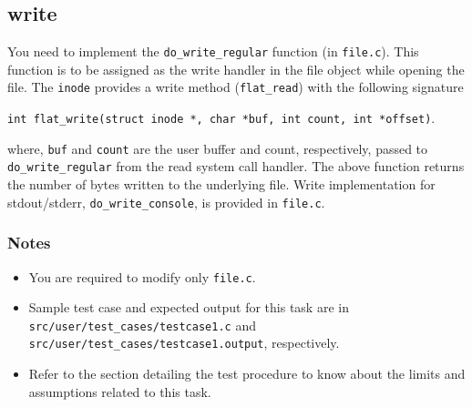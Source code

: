 \documentclass[12pt]{article}
\begin{document}
\subsection{write}

You need to implement the {\tt do\_write\_regular} function (in {\tt file.c}). This function is to be assigned as the write handler 
in the file object while opening the file. The {\tt inode} provides a write method ({\tt flat\_read}) with the following signature


\vspace{0.25cm}
\noindent
{\tt int flat\_write(struct inode *, char *buf, int count, int *offset)}. 
\vspace{0.25cm}

\noindent
where, {\tt buf} and {\tt count} are the user buffer and count, respectively, 
passed to {\tt do\_write\_regular} from the read system call handler.
%
The above function returns the number of bytes written to the underlying file.
%
Write implementation for stdout/stderr, {\tt do\_write\_console}, is provided in {\tt file.c}.



\subsubsection*{Notes}

\begin{itemize}
    \item You are required to modify only {\tt file.c}.
    \item Sample test case and expected output for this task are in {\tt src/user/test\_cases/testcase1.c}
        and {\tt src/user/test\_cases/testcase1.output}, respectively.
    \item Refer to the section detailing the test procedure to know about the limits and assumptions related to
          this task.
\end{itemize}
\end{document}

